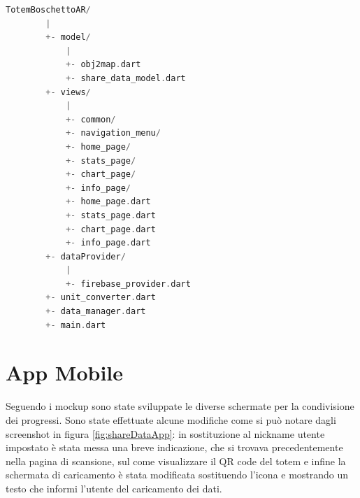 \begin{lstlisting}[language=C, caption={Albero della directory del progetto TotemBoschettoAR}, label={lst:projectDir}]
    TotemBoschettoAR/
        |
        +- model/
            |
            +- obj2map.dart
            +- share_data_model.dart
        +- views/
            |
            +- common/
            +- navigation_menu/
            +- home_page/
            +- stats_page/
            +- chart_page/
            +- info_page/
            +- home_page.dart
            +- stats_page.dart
            +- chart_page.dart
            +- info_page.dart
        +- dataProvider/
            |
            +- firebase_provider.dart
        +- unit_converter.dart
        +- data_manager.dart
        +- main.dart
\end{lstlisting}
\break
\section{App Mobile}
Seguendo i mockup sono state sviluppate le diverse schermate per la condivisione dei progressi. Sono state effettuate alcune modifiche come si può notare dagli screenshot in figura \ref{fig:shareDataApp}: in sostituzione al nickname utente impostato è stata messa una breve indicazione, che si trovava precedentemente nella pagina di scansione, sul come visualizzare il QR code del totem e infine la schermata di caricamento è stata modificata sostituendo l'icona e mostrando un testo che informi l'utente del caricamento dei dati.
